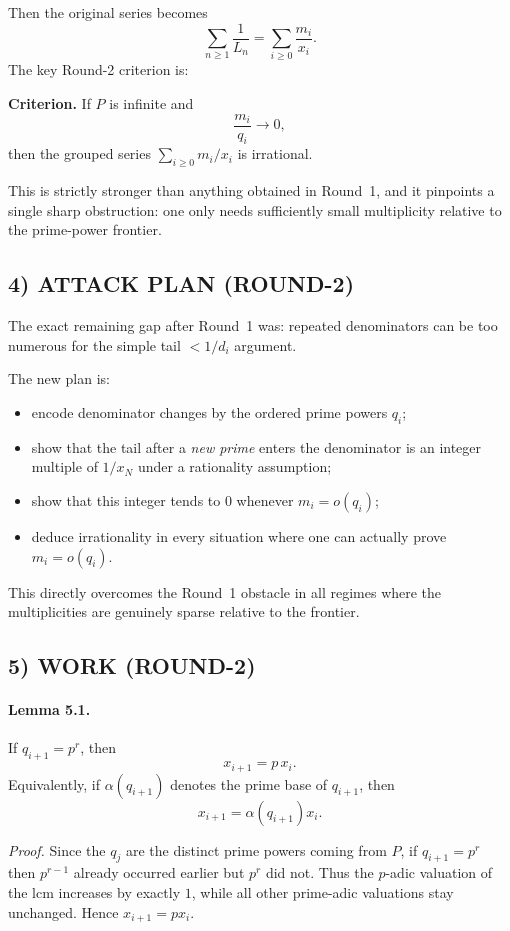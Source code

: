 Then the original series becomes
\[
\sum_{n\ge 1}\frac1{L_n}
=
\sum_{i\ge 0}\frac{m_i}{x_i}.
\]
The key Round-2 criterion is:

\medskip
\noindent
\textbf{Criterion.}
If $P$ is infinite and
\[
\frac{m_i}{q_i}\to 0,
\]
then the grouped series $\sum_{i\ge 0} m_i/x_i$ is irrational.
\medskip

This is strictly stronger than anything obtained in Round~1, and it pinpoints a single sharp obstruction: one only needs sufficiently small multiplicity relative to the prime-power frontier.

\subsection*{4) ATTACK PLAN (ROUND-2)}
The exact remaining gap after Round~1 was: repeated denominators can be too numerous for the simple tail $<1/d_i$ argument.

The new plan is:

\begin{itemize}
\item encode denominator changes by the ordered prime powers $q_i$;
\item show that the tail after a \emph{new prime} enters the denominator is an integer multiple of $1/x_N$ under a rationality assumption;
\item show that this integer tends to $0$ whenever $m_i=o(q_i)$;
\item deduce irrationality in every situation where one can actually prove $m_i=o(q_i)$.
\end{itemize}

This directly overcomes the Round~1 obstacle in all regimes where the multiplicities are genuinely sparse relative to the frontier.

\subsection*{5) WORK (ROUND-2)}

\paragraph{Lemma 5.1.}
If $q_{i+1}=p^r$, then
\[
x_{i+1}=p\,x_i.
\]
Equivalently, if $\alpha(q_{i+1})$ denotes the prime base of $q_{i+1}$, then
\[
x_{i+1}=\alpha(q_{i+1})x_i.
\]

\emph{Proof.}
Since the $q_j$ are the distinct prime powers coming from $P$, if $q_{i+1}=p^r$ then $p^{r-1}$ already occurred earlier but $p^r$ did not. Thus the $p$-adic valuation of the lcm increases by exactly $1$, while all other prime-adic valuations stay unchanged. Hence $x_{i+1}=p x_i$. 

